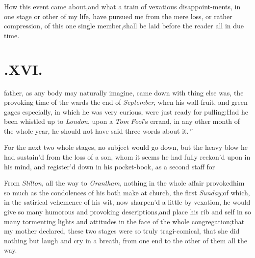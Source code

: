 \documentclass{article}
\begin{document}
How this event came about,\tsk  and what a train of vexatious
disappoint-\break ments, in one stage or other of my life, have pursued me
from the mere loss, or rather compression, of this one single
member,\tsk  shall be laid before the reader all in due time.

\null
\section{.\enspace XVI.}

 father, as any body may naturally imagine, came down with\break
{} 
 thing else was, the provoking time of the
 wards the end of
\textit{September}, when his wall-fruit, and green gages especially, in which he was
very curious, were just ready for pulling:\tsh \lqq Had he been\break
\lqq whistled up to \textit{London}, upon a \textit{Tom}\break
\lqq \textit{Fool}’s errand, in any other month of\break
\lqq the whole year, he should not have\break
\lqq said three words about it.\,”

For the next two whole stages, no\break
subject would go down, but the heavy blow he
had sustain’d from the loss of a son, whom it seems he had fully
reckon’d upon in his mind, and register’d down in his pocket-book,
as a second staff for\break
{}

From \textit{Stilton}, all the way to \textit{Grantham}, nothing in
the whole affair provoked\break him so much as the condolences of his
both make at church,
the first \textit{Sunday};\break\tsk of which, in the satirical
vehemence of his wit, now sharpen’d a little by vexation, he
would give so many humorous and provoking descriptions,\tsk  and
place his rib and self in so many tormenting lights and attitudes
in the face of the whole congregation;\tsk  that my mother
declared, these two stages were so truly tragi-comical, that she
did nothing but laugh and cry in a breath, from one end to the
other of them all the way.
\end{document}
